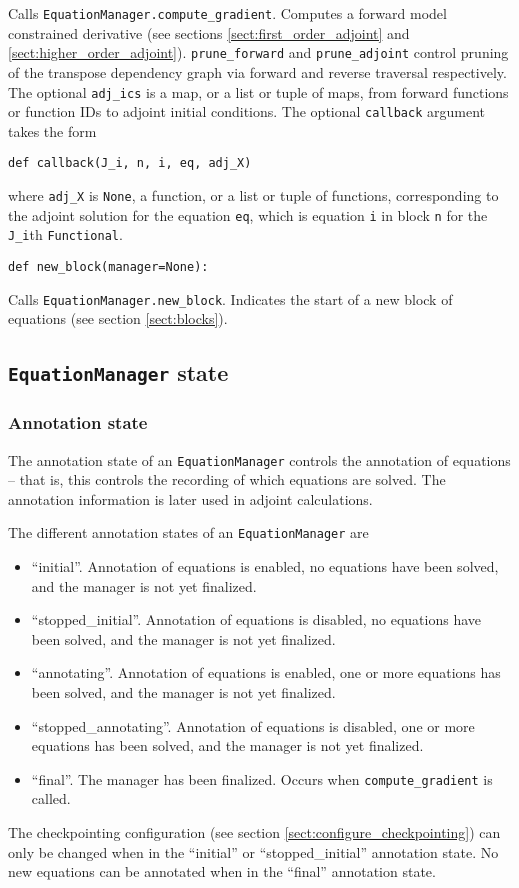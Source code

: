 \documentclass[11pt]{article}
\begin{document}
Calls \texttt{EquationManager.compute\_gradient}. Computes a forward model
constrained derivative (see sections \ref{sect:first_order_adjoint} and
\ref{sect:higher_order_adjoint}). \texttt{prune\_forward} and
\texttt{prune\_adjoint} control pruning of the transpose dependency graph via
forward and reverse traversal respectively. The optional \texttt{adj\_ics} is
a map, or a list or tuple of maps, from forward functions or function IDs to
adjoint initial conditions. The optional \texttt{callback} argument takes the
form
\begin{lstlisting}
def callback(J_i, n, i, eq, adj_X)
\end{lstlisting}
where \texttt{adj\_X} is \texttt{None}, a function, or a list or tuple of
functions, corresponding to the adjoint solution for the equation \texttt{eq},
which is equation \texttt{i} in block \texttt{n} for the \texttt{J\_i}th
\texttt{Functional}.
\begin{lstlisting}
def new_block(manager=None):
\end{lstlisting}
Calls \texttt{EquationManager.new\_block}. Indicates the start of a new block
of equations (see section \ref{sect:blocks}).

\subsection{\texttt{EquationManager} state}\label{sect:EquationManager_state}

\subsubsection{Annotation state}

The annotation state of an \texttt{EquationManager} controls the annotation of
equations -- that is, this controls the recording of which equations are
solved. The annotation information is later used in adjoint calculations.

The different annotation states of an \texttt{EquationManager} are
\begin{itemize}
  \item ``initial''. Annotation of equations is enabled, no equations have been
    solved, and the manager is not yet finalized.
  \item ``stopped\_initial''. Annotation of equations is disabled, no equations
    have been solved, and the manager is not yet finalized.
  \item ``annotating''. Annotation of equations is enabled, one or more
    equations has been solved, and the manager is not yet finalized.
  \item ``stopped\_annotating''. Annotation of equations is disabled, one or
    more equations has been solved, and the manager is not yet finalized.
  \item ``final''. The manager has been finalized. Occurs when
    \texttt{compute\_gradient} is called.
\end{itemize}
The checkpointing configuration (see section
\ref{sect:configure_checkpointing}) can only be changed when in the ``initial''
or ``stopped\_initial'' annotation state. No new equations can be annotated
when in the ``final'' annotation state.
\end{document}
